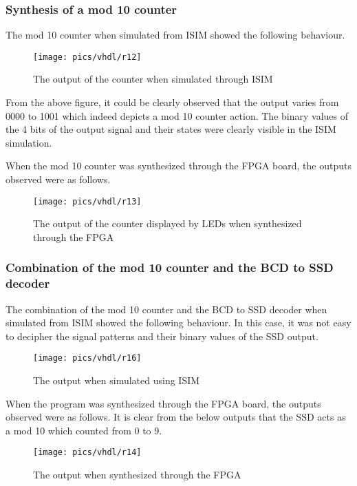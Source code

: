 \subsubsection{Synthesis of a mod 10 counter}

The  mod 10 counter when simulated from ISIM showed the following behaviour.

\begin{figure}[!h]
	\centering
	\texttt{[image: pics/vhdl/r12]}
	\caption{The output of the counter when simulated through ISIM}
	\label{fig:r12}
\end{figure}

\noindent
From the above figure, it could be clearly observed that the output varies from 0000 to 1001 which indeed depicts a mod 10 counter action. The binary values of the 4 bits of the output signal and their states were clearly visible in the ISIM simulation.

\noindent
When the mod 10 counter was synthesized through the FPGA board, the outputs observed were as follows.

\begin{figure}[!h]
	\centering
	\texttt{[image: pics/vhdl/r13]}
	\caption{The output of the counter displayed by LEDs when synthesized through the FPGA}
	\label{fig:r13}
\end{figure}

\subsubsection{Combination of the mod 10 counter and the BCD to SSD decoder}

The  combination of the mod 10 counter and the BCD to SSD decoder when simulated from ISIM showed the following behaviour. In this case, it was not easy to decipher the signal patterns and their binary values of the SSD output. 

\begin{figure}[!h]
	\centering
	\texttt{[image: pics/vhdl/r16]}
	\caption{The output  when simulated using ISIM }
	\label{fig:r15}
\end{figure}

\noindent
When the program  was synthesized through the FPGA board, the outputs observed were as follows. It is clear from the below outputs that the SSD acts as a mod 10 which counted from 0 to 9. 

\begin{figure}[!h]
	\centering
	\texttt{[image: pics/vhdl/r14]}
	\caption{The output  when synthesized through the FPGA}
	\label{fig:r14}
\end{figure}

